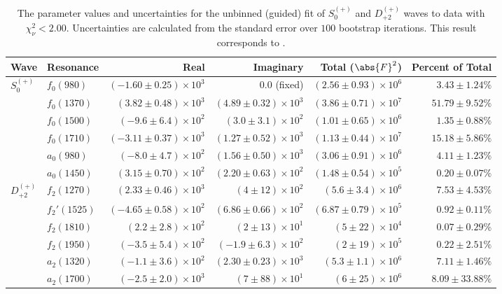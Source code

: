 \begin{table}[ht]
    \begin{center}
        \begin{tabular}{llrrrr}\toprule
        Wave & Resonance & Real & Imaginary & Total ($\abs{F}^2$) & Percent of Total \\\midrule
$S_{0}^{(+)}$ & $f_{0}(980)$ & $(-1.60 \pm 0.25) \times 10^{3}$ & $0.0$ (fixed) & $(2.56 \pm 0.93) \times 10^{6}$ & $3.43 \pm 1.24 \%$ \\
 & $f_{0}(1370)$ & $(3.82 \pm 0.48) \times 10^{3}$ & $(4.89 \pm 0.32) \times 10^{3}$ & $(3.86 \pm 0.71) \times 10^{7}$ & $51.79 \pm 9.52 \%$ \\
 & $f_{0}(1500)$ & $(-9.6 \pm 6.4) \times 10^{2}$ & $(3.0 \pm 3.1) \times 10^{2}$ & $(1.01 \pm 0.65) \times 10^{6}$ & $1.35 \pm 0.88 \%$ \\
 & $f_{0}(1710)$ & $(-3.11 \pm 0.37) \times 10^{3}$ & $(1.27 \pm 0.52) \times 10^{3}$ & $(1.13 \pm 0.44) \times 10^{7}$ & $15.18 \pm 5.86 \%$ \\
 & $a_{0}(980)$ & $(-8.0 \pm 4.7) \times 10^{2}$ & $(1.56 \pm 0.50) \times 10^{3}$ & $(3.06 \pm 0.91) \times 10^{6}$ & $4.11 \pm 1.23 \%$ \\
 & $a_{0}(1450)$ & $(3.15 \pm 0.70) \times 10^{2}$ & $(2.20 \pm 0.63) \times 10^{2}$ & $(1.48 \pm 0.54) \times 10^{5}$ & $0.20 \pm 0.07 \%$ \\
$D_{+2}^{(+)}$ & $f_{2}(1270)$ & $(2.33 \pm 0.46) \times 10^{3}$ & $(4 \pm 12) \times 10^{2}$ & $(5.6 \pm 3.4) \times 10^{6}$ & $7.53 \pm 4.53 \%$ \\
 & $f_{2}'(1525)$ & $(-4.65 \pm 0.58) \times 10^{2}$ & $(6.86 \pm 0.66) \times 10^{2}$ & $(6.87 \pm 0.79) \times 10^{5}$ & $0.92 \pm 0.11 \%$ \\
 & $f_{2}(1810)$ & $(2.2 \pm 2.8) \times 10^{2}$ & $(2 \pm 13) \times 10^{1}$ & $(5 \pm 22) \times 10^{4}$ & $0.07 \pm 0.29 \%$ \\
 & $f_{2}(1950)$ & $(-3.5 \pm 5.4) \times 10^{2}$ & $(-1.9 \pm 6.3) \times 10^{2}$ & $(2 \pm 19) \times 10^{5}$ & $0.22 \pm 2.51 \%$ \\
 & $a_{2}(1320)$ & $(-1.1 \pm 3.6) \times 10^{2}$ & $(2.30 \pm 0.23) \times 10^{3}$ & $(5.3 \pm 1.1) \times 10^{6}$ & $7.11 \pm 1.46 \%$ \\
 & $a_{2}(1700)$ & $(-2.5 \pm 2.0) \times 10^{3}$ & $(7 \pm 88) \times 10^{1}$ & $(6 \pm 25) \times 10^{6}$ & $8.09 \pm 33.88 \%$ \\\bottomrule
        \end{tabular}
    \caption{The parameter values and uncertainties for the unbinned (guided) fit of $S_{0}^{(+)}$ and $D_{+2}^{(+)}$ waves to data with $\chi^2_\nu < 2.00$. Uncertainties are calculated from the standard error over $100$ bootstrap iterations. This result corresponds to .}\label{tab:unbinned-fit-chisqdof-2.0-guided-Sp0p-Dp2p}
    \end{center}
\end{table}
